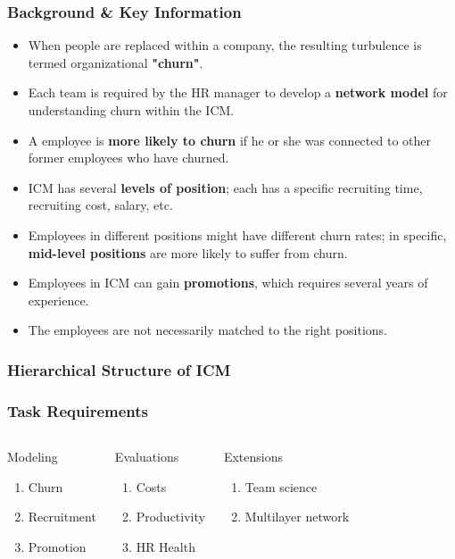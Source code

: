 \documentclass{beamer}
\begin{document}
\begin{frame}
\frametitle{Background \& Key Information}
\begin{itemize}
\item When people are replaced within a company, the resulting turbulence is termed organizational {\bf "churn"}.
\item Each team is required by the HR manager to develop a {\bf network model} for understanding churn within the ICM.
\item A employee is {\bf more likely to churn} if he or she was connected to other former employees who have churned.
\item ICM has several {\bf levels of position}; each has a specific recruiting time, recruiting cost, salary, etc.
\item Employees in different positions might have different churn rates; in specific, {\bf mid-level positions} are more likely to suffer from churn.
\item Employees in ICM can gain {\bf promotions}, which requires several years of experience.
\item The employees are not necessarily matched to the right positions.
\end{itemize}
\end{frame}


\begin{frame}
\frametitle{Hierarchical Structure of ICM}



\end{frame}


\begin{frame}
\frametitle{Task Requirements}
\begin{columns}[c]
\begin{block}{Modeling}
\begin{enumerate}
\item Churn
\item Recruitment
\item Promotion
\end{enumerate}
\end{block}
\begin{block}{Evaluations}
\begin{enumerate}
\item Costs
\item Productivity
\item HR Health
\end{enumerate}
\end{block}
\begin{block}{Extensions}
\begin{enumerate}
\item Team science
\item Multilayer network
\end{enumerate}
\end{block}
\end{columns}
\end{frame}
\end{document}
